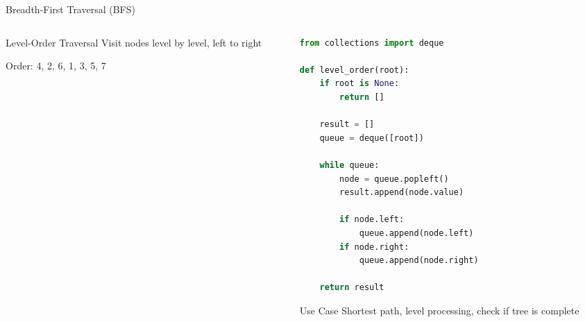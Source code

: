 \documentclass[aspectratio=169,xcolor=dvipsnames]{beamer}
\begin{document}
\begin{frame}[fragile]{Breadth-First Traversal (BFS)}
  \begin{columns}
    \begin{column}{0.45\textwidth}
      \begin{block}{Level-Order Traversal}
        Visit nodes level by level, left to right
      \end{block}


      Order: 4, 2, 6, 1, 3, 5, 7
    \end{column}
    \begin{column}{0.5\textwidth}
      \begin{lstlisting}[language=Python,basicstyle=\tiny\ttfamily]
from collections import deque

def level_order(root):
    if root is None:
        return []

    result = []
    queue = deque([root])

    while queue:
        node = queue.popleft()
        result.append(node.value)

        if node.left:
            queue.append(node.left)
        if node.right:
            queue.append(node.right)

    return result
      \end{lstlisting}

      \begin{alertblock}{Use Case}
        Shortest path, level processing, check if tree is complete
      \end{alertblock}
    \end{column}
  \end{columns}
\end{frame}
\end{document}

